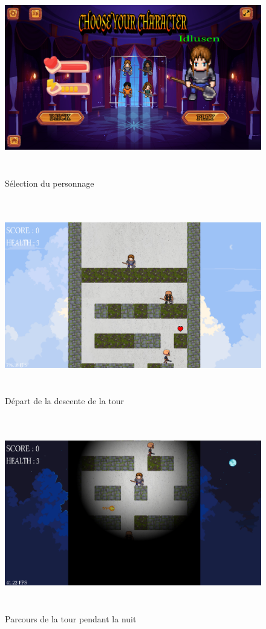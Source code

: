 \documentclass[a4paper,12pt]{article}
\begin{document}
\begin{appendices}
\newpage
\begin{figure}[h]
	\centering
	\includegraphics[height=8.5cm]{img/ecran_selection.png}
	\caption{Sélection du personnage}
	\label{selection_personnage}
\end{figure}
\begin{figure}[h]
	\centering
	\includegraphics[height=8.5cm]{img/ecran_debut.png}
	\caption{Départ de la descente de la tour}
	\label{départ}
\end{figure}
\newpage
\begin{figure}[h]
	\includegraphics[height=8.5cm]{img/ecran_nuit.png}
	\caption{Parcours de la tour pendant la nuit}
	\label{tour_nuit}
\end{figure}

\end{appendices}
\end{document}
